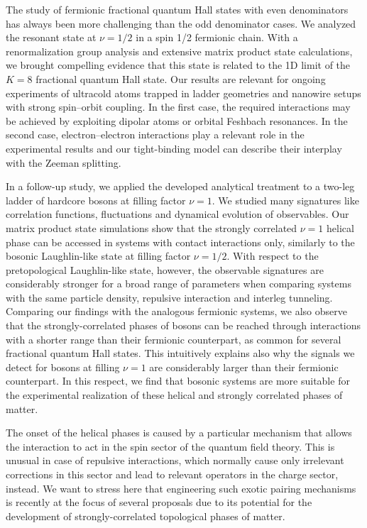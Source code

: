 The study of fermionic fractional quantum Hall states with even denominators has always been more challenging than the odd denominator cases.
We analyzed the resonant state at $\nu=1/2$ in a spin 1/2 fermionic chain.
With a renormalization group analysis and extensive matrix product state calculations, we brought compelling evidence that this state is related to the 1D limit of the $K=8$ fractional quantum Hall state.
Our results are relevant for ongoing experiments of ultracold atoms trapped in ladder geometries and nanowire setups with strong spin–orbit coupling.
In the first case, the required interactions may be achieved by exploiting dipolar atoms or orbital Feshbach resonances.
In the second case, electron–electron interactions play a relevant role in the experimental results and our tight-binding model can describe their interplay with the Zeeman splitting.

In a follow-up study, we applied the developed analytical treatment to a two-leg ladder of hardcore bosons at filling factor $\nu=1$.
We studied many signatures like correlation functions, fluctuations and dynamical evolution of observables.
Our matrix product state simulations show that the strongly correlated $\nu=1$ helical phase can be accessed in systems with contact interactions only, similarly to the bosonic Laughlin-like state at filling factor $\nu = 1/2$.
With respect to the pretopological Laughlin-like state, however, the observable signatures are considerably stronger for a broad range of parameters when comparing systems with the same particle density, repulsive interaction and interleg tunneling.
Comparing our findings with the analogous fermionic systems, we also observe that the strongly-correlated phases of bosons can be reached through interactions with a shorter range than their fermionic counterpart, as common for several fractional quantum Hall states.
This intuitively explains also why the signals we detect for bosons at filling $\nu = 1$ are considerably larger than their fermionic counterpart.
In this respect, we find that bosonic systems are more suitable for the experimental realization of these helical and strongly correlated phases of matter.

The onset of the helical phases is caused by a particular mechanism that allows the interaction to act in the spin sector of the quantum field theory.
This is unusual in case of repulsive interactions, which normally cause only irrelevant corrections in this sector and lead to relevant operators in the charge sector, instead.
We want to stress here that engineering such exotic pairing mechanisms is recently at the focus of several proposals due to its potential for the development of strongly-correlated topological phases of matter.

